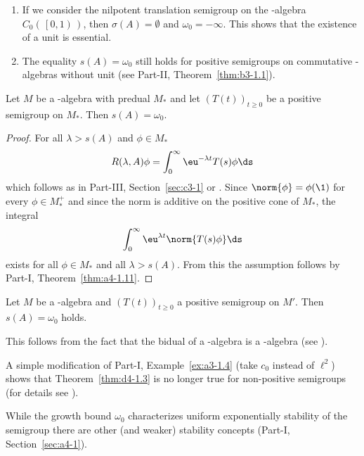 \begin{remark}\label{rem:d4-1.2}
\begin{enumerate}[\upshape (i), wide, labelindent=.25em]
\item
If we consider the nilpotent translation semigroup on the \CA-algebra $C_{0}(\,\left[0,1\right)\,)$, then $\sigma(A) = \emptyset$ and $\omega_{0} = -\infty$.
This shows that the existence of a unit is essential.

\item
The equality $s(A) = \omega_{0}$ still holds for positive semigroups on commutative \CA-algebras without unit 
(see Part-II, Theorem~\ref{thm:b3-1.1}).
\end{enumerate}
\end{remark}
\begin{theorem}\label{thm:d4-1.3}
Let $M$ be a \WA-algebra with predual $M_{*}$ and let $(T(t))_{t \geq 0}$ be a positive semigroup on $M_{*}$.
Then $s(A) = \omega_{0}$.
\end{theorem}
\begin{proof}
For all $\lambda > s(A)$ and $\phi \in M_{*}$
\[
R(\lambda,A)\phi = \int_{0}^{\infty} \eu^{-\lambda t}T(s)\phi \ds
\]
which follows as in Part-III, Section~\ref{sec:c3-1} or \textcite[Theorem 3]{greinervoigtwolff:1981}.
Since $\norm{\phi} = \phi(\1)$ for every $\phi \in M_{*}^{+}$ and since the norm is additive on the positive cone of\/ $M_{*}$, the integral
\[
	\int_{0}^{\infty} \eu^{\lambda t}\norm{T(s)\phi} \ds
\]
exists for all $\phi \in M_{*}$ and all $\lambda > s(A)$.
From this the assumption follows by Part-I, Theorem~\ref{thm:a4-1.11}.
\end{proof}
\begin{corollary}\label{cor:d4-1.4}
Let $M$ be a \CA-algebra and $(T(t))_{t \geq 0}$ a positive semigroup on $M'$.
Then $s(A) = \omega_{0}$ holds.
\end{corollary}
\noindent This follows from the fact that the bidual of a \CA-algebra is a \WA-algebra (see \textcite[Theorem III.2.4.]{takesaki:1979}).
\begin{remark}\label{rem:d4-1.5}
A simple modification of Part-I, Example~\ref{ex:a3-1.4} (take $c_{0}$ instead of\/ $\ell^2$) shows that Theorem~\ref{thm:d4-1.3} is no longer true for non-positive semigroups (for details see \textcite[Beispiel 2.5]{grohneubrander:1981}).

While the growth bound $\omega_{0}$ characterizes uniform exponentially stability of the semigroup there are other (and weaker) stability concepts (\cf Part-I, Section~\ref{sec:a4-1}).
\end{remark}
